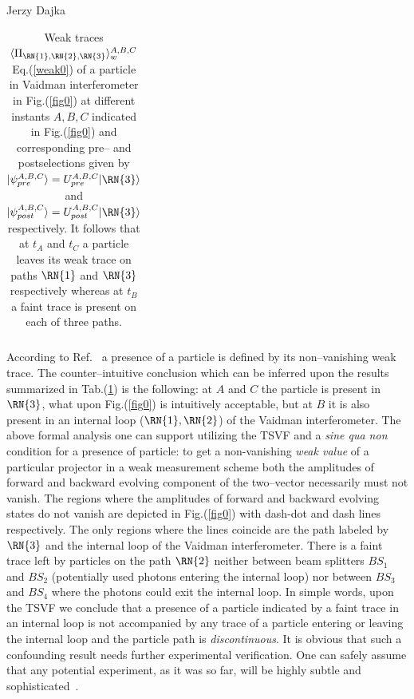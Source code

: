 \begin{artengenv}{Jerzy Dajka}
\begin{table}[ht]
\begin{tabular}{|l||lll|ll|}
\end{tabular}
\caption{\label{tab0} Weak traces $\langle\Pi_{\RN{1},\RN{2},\RN{3}}\rangle_w^{A,B,C}$ Eq.(\ref{weak0}) of a particle in Vaidman interferometer in Fig.(\ref{fig0}) at different instants $A,B,C$ indicated in Fig.(\ref{fig0}) and corresponding pre-- and postselections given by $|\psi_{pre}^{A,B,C}\rangle=U_{pre}^{A,B,C}|\RN{3}\rangle$ and $|\psi_{post}^{A,B,C}\rangle=U_{post}^{A,B,C}|\RN{3}\rangle$ respectively. It follows that at $t_A$ and $t_C$ a particle leaves its weak trace on paths $\RN{1}$ and $\RN{3}$ respectively whereas at $t_B$ a faint trace is present on each of three paths.}
\end{table}
According to Ref.~\parencite{PhysRevA.87.052104} a presence of a particle is defined by 
its non--vanishing weak trace. The counter--intuitive conclusion which can be inferred upon the results summarized in Tab.(\ref{tab0}) is the following: at $A$ and $C$ the particle is present in $\RN{3}$, what upon Fig.(\ref{fig0}) is intuitively acceptable, but at $B$ it is also present in an internal loop ($\RN{1},\RN{2}$) of the Vaidman interferometer.  The above formal analysis one can support  utilizing the TSVF and a {\it sine qua non} condition for a presence of particle: to get a non-vanishing  
{\it weak value} of a  particular projector in a  weak measurement scheme  both the amplitudes of  forward and backward evolving component of the two--vector  necessarily   must  not vanish.  The regions where the amplitudes of forward and backward evolving states do not vanish are depicted in Fig.(\ref{fig0}) with dash-dot and dash lines respectively. The only regions where the lines coincide are the path labeled by $\RN{3}$ and the internal loop of the Vaidman interferometer. There is a faint trace left by  particles  on the path $\RN{2}$ neither between beam splitters $BS_1$ and $BS_2$ (potentially used  photons entering the internal loop) nor between $BS_3$ and $BS_4$ where the photons could exit the internal loop. In simple words, upon the TSVF we conclude that a presence of a particle indicated by a faint trace  in an internal loop is not accompanied by any trace of a particle entering or leaving the internal loop and the particle path is 
{\it discontinuous}.  It is obvious that such a confounding result needs further experimental verification. One can safely assume that any potential experiment, as it was so far, will be highly subtle and sophisticated~\parencite{e20110854,PhysRevA.101.052119,pnas,pnas1}. 








\end{artengenv}
